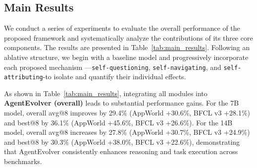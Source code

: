 \subsection{Main Results}\label{sec:main_results}

We conduct a series of experiments to evaluate the overall performance of the proposed \AgentEvolver framework and systematically analyze the contributions of its three core components. The results are presented in Table~\ref{tab:main_results}. Following an ablative structure, we begin with a baseline model and progressively incorporate each proposed mechanism —\texttt{self-questioning}, \texttt{self-navigating}, and \texttt{self-attributing}-to isolate and quantify their individual effects.

As shown in Table~\ref{tab:main_results}, integrating all modules into \textbf{AgentEvolver (overall)} leads to substantial performance gains. For the 7B model, overall avg@8 improves by 29.4\% (AppWorld +30.6\%, BFCL v3 +28.1\%) and best@8 by 36.1\% (AppWorld +45.6\%, BFCL v3 +26.6\%). For the 14B model, overall avg@8 increases by 27.8\% (AppWorld +30.7\%, BFCL v3 +24.9\%) and best@8 by 30.3\% (AppWorld +38.0\%, BFCL v3 +22.6\%), demonstrating that AgentEvolver consistently enhances reasoning and task execution across benchmarks.


